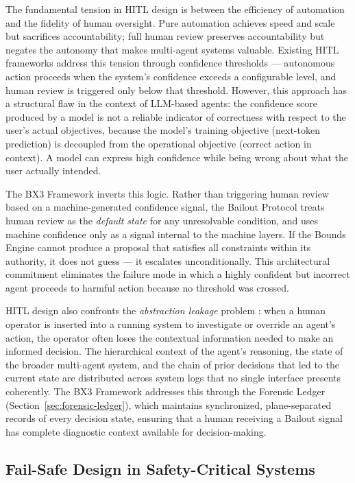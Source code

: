 The fundamental tension in HITL design is between the efficiency of automation and the fidelity of human oversight. Pure automation achieves speed and scale but sacrifices accountability; full human review preserves accountability but negates the autonomy that makes multi-agent systems valuable. Existing HITL frameworks address this tension through confidence thresholds --- autonomous action proceeds when the system's confidence exceeds a configurable level, and human review is triggered only below that threshold. However, this approach has a structural flaw in the context of LLM-based agents: the confidence score produced by a model is not a reliable indicator of correctness with respect to the user's actual objectives, because the model's training objective (next-token prediction) is decoupled from the operational objective (correct action in context). A model can express high confidence while being wrong about what the user actually intended.

The BX3 Framework inverts this logic. Rather than triggering human review based on a machine-generated confidence signal, the Bailout Protocol treats human review as the \textit{default state} for any unresolvable condition, and uses machine confidence only as a signal internal to the machine layers. If the Bounds Engine cannot produce a proposal that satisfies all constraints within its authority, it does not guess --- it escalates unconditionally. This architectural commitment eliminates the failure mode in which a highly confident but incorrect agent proceeds to harmful action because no threshold was crossed.

HITL design also confronts the \textit{abstraction leakage} problem \cite{trist1981}: when a human operator is inserted into a running system to investigate or override an agent's action, the operator often loses the contextual information needed to make an informed decision. The hierarchical context of the agent's reasoning, the state of the broader multi-agent system, and the chain of prior decisions that led to the current state are distributed across system logs that no single interface presents coherently. The BX3 Framework addresses this through the Forensic Ledger (Section~\ref{sec:forensic-ledger}), which maintains synchronized, plane-separated records of every decision state, ensuring that a human receiving a Bailout signal has complete diagnostic context available for decision-making.

\subsection{Fail-Safe Design in Safety-Critical Systems}

